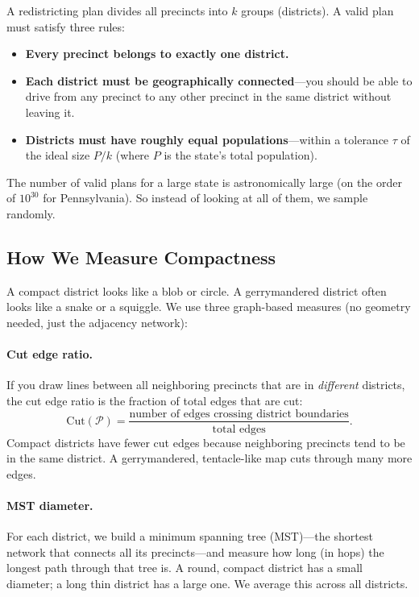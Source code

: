 \documentclass[11pt]{article}
\begin{document}
A redistricting plan divides all precincts into $k$ groups
(districts). A valid plan must satisfy three rules:
\begin{itemize}
  \item \textbf{Every precinct belongs to exactly one district.}
  \item \textbf{Each district must be geographically connected}---you
    should be able to drive from any precinct to any other precinct in
    the same district without leaving it.
  \item \textbf{Districts must have roughly equal populations}---within
    a tolerance $\tau$ of the ideal size $P / k$ (where $P$ is the
    state's total population).
\end{itemize}

The number of valid plans for a large state is astronomically large
(on the order of $10^{30}$ for Pennsylvania). So instead of looking at
all of them, we sample randomly.

\subsection{How We Measure Compactness}

A compact district looks like a blob or circle. A gerrymandered district
often looks like a snake or a squiggle. We use three graph-based
measures (no geometry needed, just the adjacency network):

\paragraph{Cut edge ratio.} If you draw lines between all neighboring
precincts that are in \emph{different} districts, the cut edge ratio is
the fraction of total edges that are cut:
\[
  \mathrm{Cut}(\mathcal{P})
  = \frac{\text{number of edges crossing district boundaries}}{\text{total edges}}.
\]
Compact districts have fewer cut edges because neighboring precincts
tend to be in the same district. A gerrymandered, tentacle-like map
cuts through many more edges.

\paragraph{MST diameter.} For each district, we build a
minimum spanning tree (MST)---the shortest network that connects all
its precincts---and measure how long (in hops) the longest path through
that tree is. A round, compact district has a small diameter; a long
thin district has a large one. We average this across all districts.
\end{document}
